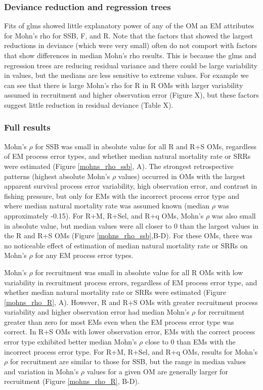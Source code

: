 \documentclass[
  12pt,
]{article}
\begin{document}
\subsubsection*{Deviance reduction and regression
trees}\label{deviance-reduction-and-regression-trees-1}

Fits of glms showed little explanatory power of any of the OM an EM
attributes for Mohn's rho for SSB, F, and R. Note that the factors that
showed the largest reductions in deviance (which were very small) often
do not comport with factors that show differences in median Mohn's rho
results. This is because the glms and regression trees are reducing
residual variance and there could be large variability in values, but
the medians are less sensitive to extreme values. For example we can see
that there is large Mohn's rho for R in R OMs with larger variability
assumed in recruitment and higher observation error (Figure X), but
these factors suggest little reduction in residual deviance (Table X).

\subsubsection*{Full results}\label{full-results-4}

Mohn's \(\rho\) for SSB was small in absolute value for all R and R+S
OMs, regardless of EM process error types, and whether median natural
mortality rate or SRRs were estimated (Figure \ref{mohns_rho_ssb}, A).
The strongest retrospective patterns (highest absolute Mohn's \(\rho\)
values) occurred in OMs with the largest apparent survival process error
variability, high observation error, and contrast in fishing pressure,
but only for EMs with the incorrect process error type and where median
natural mortality rate was assumed known (median \(\rho\) was
approximately -0.15). For R+M, R+Sel, and R+q OMs, Mohn's \(\rho\) was
also small in absolute value, but median values were all closer to 0
than the largest values in the R and R+S OMs (Figure
\ref{mohns_rho_ssb},B-D). For these OMs, there was no noticeable effect
of estimation of median natural mortality rate or SRRs on Mohn's
\(\rho\) for any EM process error types.

Mohn's \(\rho\) for recruitment was small in absolute value for all R
OMs with low variability in recruitment process errors, regardless of EM
process error type, and whether median natural mortality rate or SRRs
were estimated (Figure \ref{mohns_rho_R}, A). However, R and R+S OMs
with greater recruitment process variability and higher observation
error had median Mohn's \(\rho\) for recruitment greater than zero for
most EMs even when the EM process error type was correct. In R+S OMs
with lower observation error, EMs with the correct process error type
exhibited better median Mohn's \(\rho\) close to 0 than EMs with the
incorrect process error type. For R+M, R+Sel, and R+q OMs, results for
Mohn's \(\rho\) for recruitment are similar to those for SSB, but the
range in median values and variation in Mohn's \(\rho\) values for a
given OM are generally larger for recruitment (Figure \ref{mohns_rho_R},
B-D).
\end{document}
